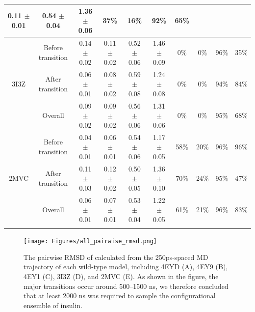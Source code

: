 \documentclass[sn-vancouver]{sn-jnl}
\begin{document}
\begin{table}[ht]
{\begin{tabular}{@{}cccccccccc@{}}
  0.11 $\pm$ 0.01 &
  \multicolumn{1}{c}{0.54 $\pm$ 0.04} &
  1.36 $\pm$ 0.06 &
  \multicolumn{1}{c}{37\%} &
  \multicolumn{1}{c}{16\%} &
  \multicolumn{1}{c}{92\%} &
  65\% \\ \midrule
\multicolumn{1}{c}{\multirow{3}{*}{3I3Z}} &
  Before transition &
  \multicolumn{1}{c}{0.14 $\pm$ 0.02} &
  0.11 $\pm$ 0.02 &
  \multicolumn{1}{c}{0.52 $\pm$ 0.06} &
  1.46 $\pm$ 0.09 &
  \multicolumn{1}{c}{0\%} &
  \multicolumn{1}{c}{0\%} &
  \multicolumn{1}{c}{96\%} &
  35\% \\ %
\multicolumn{1}{c}{} &
  After transition &
  \multicolumn{1}{c}{0.06 $\pm$ 0.01} &
  0.08 $\pm$ 0.02 &
  \multicolumn{1}{c}{0.59 $\pm$ 0.08} &
  1.24 $\pm$ 0.08 &
  \multicolumn{1}{c}{0\%} &
  \multicolumn{1}{c}{0\%} &
  \multicolumn{1}{c}{94\%} &
  84\% \\ %
\multicolumn{1}{c}{} &
  Overall &
  \multicolumn{1}{c}{0.09 $\pm$ 0.02} &
  0.09 $\pm$ 0.02 &
  \multicolumn{1}{c}{0.56 $\pm$ 0.06} &
  1.31 $\pm$ 0.06 &
  \multicolumn{1}{c}{0\%} &
  \multicolumn{1}{c}{0\%} &
  \multicolumn{1}{c}{95\%} &
  68\% \\ \midrule
\multicolumn{1}{c}{\multirow{3}{*}{2MVC}} &
  Before transition &
  \multicolumn{1}{c}{0.04 $\pm$ 0.01} &
  0.06 $\pm$ 0.01 &
  \multicolumn{1}{c}{0.54 $\pm$ 0.06} &
  1.17 $\pm$ 0.05 &
  \multicolumn{1}{c}{58\%} &
  \multicolumn{1}{c}{20\%} &
  \multicolumn{1}{c}{96\%} &
  96\% \\ %
\multicolumn{1}{c}{} &
  After transition &
  \multicolumn{1}{c}{0.11 $\pm$ 0.03} &
  0.12 $\pm$ 0.02 &
  \multicolumn{1}{c}{0.50 $\pm$ 0.05} &
  1.36 $\pm$ 0.10 &
  \multicolumn{1}{c}{70\%} &
  \multicolumn{1}{c}{24\%} &
  \multicolumn{1}{c}{95\%} &
  47\% \\ %
\multicolumn{1}{c}{} &
  Overall &
  \multicolumn{1}{c}{0.06 $\pm$ 0.01} &
  0.07 $\pm$ 0.01 &
  \multicolumn{1}{c}{0.53 $\pm$ 0.04} &
  1.22 $\pm$ 0.05 &
  \multicolumn{1}{c}{61\%} &
  \multicolumn{1}{c}{21\%} &
  \multicolumn{1}{c}{96\%} &
  83\% \\ \botrule
\end{tabular}%
}
\label{ranges}
\end{table}

\renewcommand{\thefigure}{S\arabic{figure}}
\begin{figure}[H]
\centering
\texttt{[image: Figures/all\_pairwise\_rmsd.png]}
\caption{The pairwise RMSD of calculated from the 250ps-spaced MD trajectory of each wild-type model, including 4EYD (A), 4EY9 (B), 4EY1 (C), 3I3Z (D), and 2MVC (E). As shown in the figure, the major transitions occur around 500--1500 ns, we therefore concluded that at least 2000 ns was required to sample the configurational ensemble of insulin.}
\label{supple_fig: pairwise_rmsd}
\end{figure}
\end{document}
